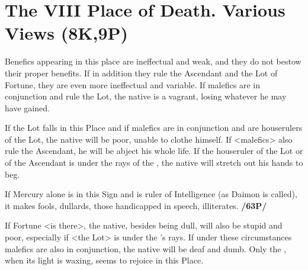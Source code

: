 \section{The VIII Place of Death. Various Views (8K,9P)}
Benefics appearing in this place are ineffectual and weak, and they do not bestow their proper benefits. If in addition they rule the Ascendant and the Lot of Fortune, they are even more ineffectual and variable. If malefics are in conjunction and rule the Lot, the native is a vagrant, losing whatever he may have gained.

If the Lot falls in this Place and if malefics are in conjunction and are houserulers of the Lot, the native will be poor, unable to clothe himself. If <malefics> also rule the Ascendant, he will be abject his whole life. If the houseruler of the Lot or of the Ascendant is under the rays of the \Sun, the native will stretch out his hands to beg. 

If Mercury alone is in this Sign and is ruler of Intelligence (as Daimon is called), it makes fools, dullards, those handicapped in speech, illiterates. \textbf{/63P/}

If Fortune <is there>, the native, besides being dull, will also be stupid and poor, especially if <the Lot> is under the \Sun's rays. If under these circumstances malefics are also in conjunction, the native will be deaf and dumb.  Only the \Moon, when its light is waxing, seems to rejoice in this Place.

\newpage